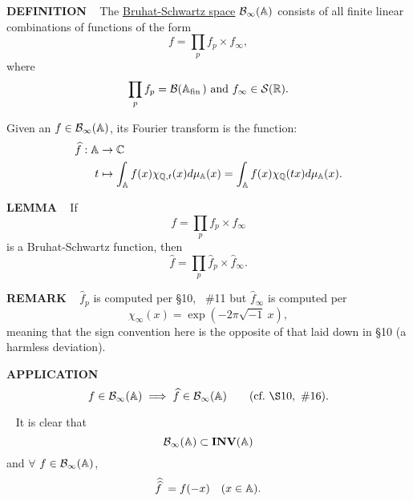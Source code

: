 \vspace{0.1cm}

\begin{x}{\small\bf DEFINITION} \ %
The 
\underline{Bruhat-Schwartz space}
$\sB_\infty(\A)$
\index{$\sB_\infty(\A)$}  
consists of all finite linear combinations of functions of the form
\[
f = \prod_p f_{p} \times f_\infty,
\]
where 
\[
\prod_p f_p = \mathcal{B}(\mathbb{A}_{\text{fin}\hspace{0.05cm}}) \text{ and } f_\infty \in \mathcal{S}(\mathbb{R}).
\]
\end{x}

\vspace{0.1cm}

Given an $f \in \mathcal{B}_\infty(\mathbb{A})$, its Fourier transform is the function:
\begin{align*}
\widehat{f}:\mathbb{A} 	
&\rightarrow \mathbb{C}\\	
t 		
&\mapsto \int_{\mathbb{A}} f(x) \chi_{\mathbb{Q},t}(x) d\mu_{\mathbb{A}}(x) = \int_{\mathbb{A}} f(x) \chi_{\mathbb{Q}}(tx) d\mu_{\mathbb{A}}(x).	
\end{align*}

\vspace{0.1cm}

\begin{x}{\small\bf LEMMA} \ %
If
\[
f = \prod_p f_p \times f_\infty
\]
is a Bruhat-Schwartz function, then
\[
\widehat{f} = \prod_p \widehat{f}_p \times \widehat{f}_\infty.
\]
\end{x}
\vspace{0.1cm}

\begin{x}{\small\bf REMARK} \ %
$\widehat{f}_p$ is computed per \S10, \  \#11 but $\widehat{f}_\infty$ is computed per
\[
\chi_\infty(x) = \exp(-2\pi\sqrt{-1} \ x),
\]
meaning that the sign convention here is the opposite of that laid down in \S10 (a harmless deviation).
\end{x}

\vspace{0.1cm}


\begin{x}{\small\bf APPLICATION} \ %
\[
f \in \sB_\infty(\A) \implies \widehat{f} \in \sB_\infty(\A) \qquad (\text{cf.} \  \S10, \  \#16).
\]
\end{x}

\vspace{0.1cm}


\begin{x}{\small\bf {}} \ %
It is clear that
\[
\mathcal{B}_\infty(\mathbb{A}) \subset \textbf{INV}(\mathbb{A})
\]
and $\forall$ $f \in \mathcal{B}_\infty(\mathbb{A})$,
\[
\widehat{\widehat{f}\hspace{0.1cm}} = f(-x) \quad \text{$( x \in \mathbb{A})$}.
\]
\end{x}

